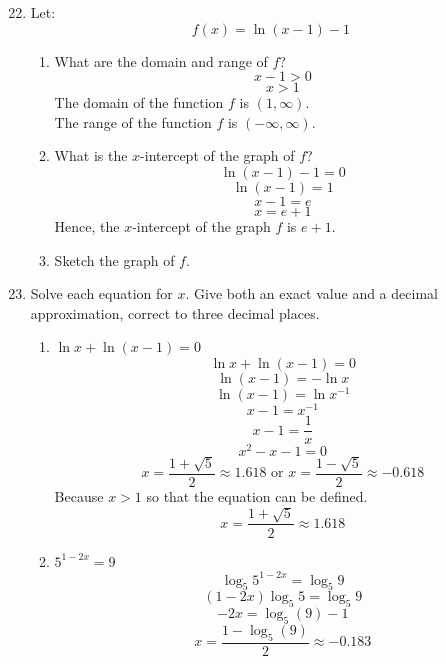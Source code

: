 \documentclass[12pt]{article}
\begin{document}
\begin{enumerate}
\setcounter{enumi}{21}
    \item Let:
    \[f(x) = \ln(x-1) - 1\]
    \begin{enumerate}
        \item What are the domain and range of $f$?
        \[x-1 > 0\]
        \[x > 1\]
        The domain of the function $f$ is $(1,\infty)$.\\
        The range of the function $f$ is $(-\infty, \infty)$.
        \item What is the $x$-intercept of the graph of $f$?
        \[\ln(x-1) - 1 = 0\]
        \[\ln(x-1) = 1\]
        \[x-1 = e\]
        \[x = e + 1\]
        Hence, the $x$-intercept of the graph $f$ is $e+1$.
        \item Sketch the graph of $f$.
        \begin{center}
        \end{center}
    \end{enumerate}

\setcounter{enumi}{24}
    \item Solve each equation for $x$. Give both an exact value and a decimal approximation, correct to three decimal places.
    \begin{enumerate}
        \item \(\ln x + \ln (x-1) = 0\)
        \[\ln x + \ln (x-1) = 0\]
        \[\ln (x-1) = - \ln x\]
        \[\ln(x-1) = \ln x^{-1}\]
        \[x - 1 = x^{-1}\]
        \[x - 1 = \frac{1}{x}\]
        \[x^2 - x - 1 = 0\]
        \[x = \frac{1+\sqrt{5}}{2} \approx 1.618 \text{ or } x = \frac{1-\sqrt{5}}{2} \approx -0.618\]
        Because $x > 1$ so that the equation can be defined.
        \[x = \frac{1+\sqrt{5}}{2} \approx 1.618\]
        \item \(5^{1-2x} = 9\)
        \[\log_5 5^{1-2x} = \log_5 9\]
        \[(1-2x)\log_5 5 = \log_5 9\]
        \[-2x = \log_5 (9) - 1 \]
        \[x = \frac{1 - \log_5 (9)}{2} \approx -0.183\]
    \end{enumerate}


\end{enumerate}
\end{document}
